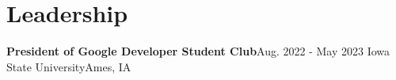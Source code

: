 \section{Leadership}

    \resumeSubHeadingListStart
      \resumeSubheading
          {\textbf{President of Google Developer Student Club}}{Aug. 2022 - May 2023}
          {Iowa State University}{Ames, IA}
        \resumeItemListStart
        \resumeItemListEnd
    \resumeSubHeadingListEnd